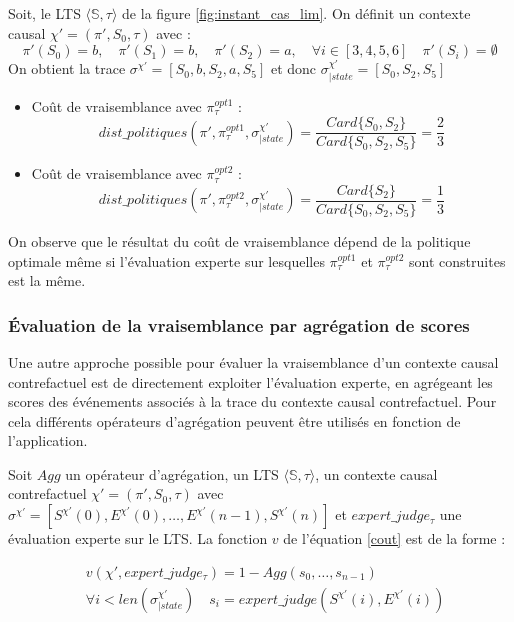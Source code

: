 Soit, le LTS $\langle\mathds{S},\tau\rangle$ de la figure \ref{fig:instant_cas_lim}.  On définit un contexte causal $\chi'=(\pi',S_0,\tau)$ avec :
$$\pi'(S_0)= b,\quad \pi'(S_1) = b,\quad \pi'(S_2)=a,\quad \forall i\in[3,4,5,6]\quad  \pi'(S_i)=\emptyset$$
On obtient la trace $\sigma^{\chi'}=[S_0,b,S_2,a,S_5]$ et donc $\sigma_{|state}^{\chi'}=[S_0,S_2,S_5]$
\begin{itemize}
    \item Coût de vraisemblance avec $\pi^{opt1}_\tau$ :
    \begin{equation*}
        dist\_politiques(\pi',\pi^{opt1}_\tau, \sigma^{\chi'}_{|state}) = \frac{Card{\{S_0,S_2\}}}{Card\{S_0,S_2,S_5\}} = \frac{2}{3}
    \end{equation*}
    
    \item Coût de vraisemblance avec $\pi^{opt2}_\tau$ :
    \begin{equation*}
        dist\_politiques(\pi',\pi^{opt2}_\tau, \sigma^{\chi'}_{|state}) = \frac{Card{\{S_2\}}}{Card\{S_0,S_2,S_5\}} = \frac{1}{3}
    \end{equation*}
\end{itemize}
On observe que le résultat du coût de vraisemblance dépend de la politique optimale même si l'évaluation experte sur lesquelles $\pi^{opt1}_\tau$ et $\pi^{opt2}_\tau$ sont construites est la même.

\subsubsection{Évaluation de la vraisemblance par agrégation de scores}\label{agre_v}
Une autre approche possible pour évaluer la vraisemblance d'un contexte causal contrefactuel est de directement exploiter l'évaluation experte, en agrégeant les scores des événements associés à la trace du contexte causal contrefactuel. Pour cela différents opérateurs d'agrégation peuvent être utilisés en fonction de l'application.



Soit $Agg$ un opérateur d'agrégation, un LTS $\langle \mathds{S},\tau \rangle$, un contexte causal contrefactuel $\chi'= (\pi',S_0,\tau)$ avec $\sigma^{\chi'}= [S^{\chi'}(0),E^{\chi'}(0),\dots,E^{\chi'}(n-1),S^{\chi'}(n)]$ et $expert\_judge_\tau$ une évaluation experte sur le LTS. La fonction $v$ de l'équation \ref{cout} est de la forme :

\begin{equation}\label{exploit_direct}
    \begin{aligned}
        &v(\chi',expert\_judge_\tau)= 1 - Agg(s_0, \dots, s_{n-1}) \\
        & \forall i < len(\sigma^{\chi'}_{|state}) \quad s_i= expert\_judge(S^{\chi'}(i),E^{\chi'}(i))
    \end{aligned}
\end{equation}


